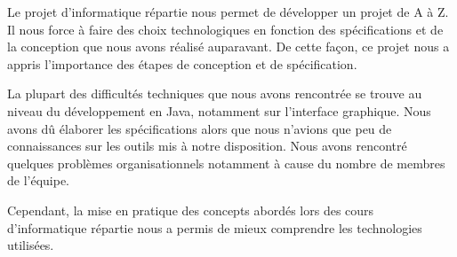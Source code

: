 Le projet d'informatique répartie nous permet de développer un projet de A à Z. Il nous force à faire des choix technologiques en fonction des spécifications et de la conception que nous avons réalisé auparavant. De cette façon, ce projet nous a appris l'importance des étapes de conception et de spécification. 

La plupart des difficultés techniques que nous avons rencontrée se trouve au niveau du développement en Java, notamment sur l'interface graphique. Nous avons dû élaborer les spécifications alors que nous n'avions que peu de connaissances sur les outils mis à notre disposition. Nous avons rencontré quelques problèmes organisationnels notamment à cause du nombre de membres de l'équipe. 

Cependant, la mise en pratique des concepts abordés lors des cours d'informatique répartie nous a permis de mieux comprendre les technologies utilisées.